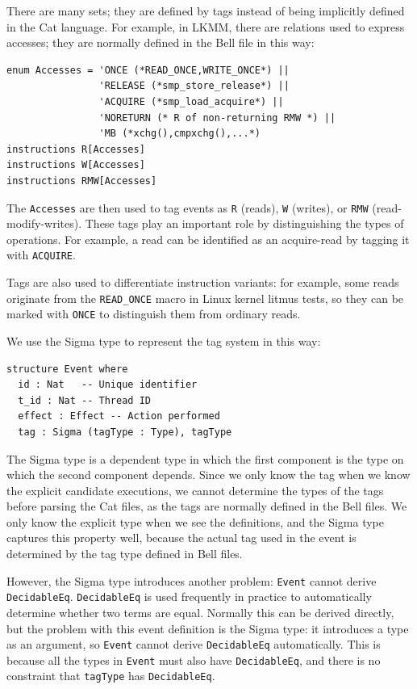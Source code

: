 There are many sets; they are defined by tags instead of being implicitly defined in the Cat language. For example, in LKMM, there are relations used to express accesses; they are normally defined in the Bell file in this way:

\begin{verbatim}
enum Accesses = 'ONCE (*READ_ONCE,WRITE_ONCE*) ||
                'RELEASE (*smp_store_release*) ||
                'ACQUIRE (*smp_load_acquire*) ||
                'NORETURN (* R of non-returning RMW *) ||
                'MB (*xchg(),cmpxchg(),...*)
instructions R[Accesses]
instructions W[Accesses]
instructions RMW[Accesses]
\end{verbatim}

The \texttt{Accesses} are then used to tag events as \texttt{R} (reads), \texttt{W} (writes), or \texttt{RMW} (read-modify-writes). These tags play an important role by distinguishing the types of operations. For example, a read can be identified as an acquire-read by tagging it with \texttt{ACQUIRE}.

Tags are also used to differentiate instruction variants: for example, some reads originate from the \texttt{READ\_ONCE} macro in Linux kernel litmus tests, so they can be marked with \texttt{ONCE} to distinguish them from ordinary reads.

We use the Sigma type to represent the tag system in this way:
\begin{verbatim}
structure Event where
  id : Nat   -- Unique identifier
  t_id : Nat -- Thread ID
  effect : Effect -- Action performed
  tag : Sigma (tagType : Type), tagType
\end{verbatim}

The Sigma type is a dependent type in which the first component is the type on which the second component depends. Since we only know the tag when we know the explicit candidate executions, we cannot determine the types of the tags before parsing the Cat files, as the tags are normally defined in the Bell files. We only know the explicit type when we see the definitions, and the Sigma type captures this property well, because the actual tag used in the event is determined by the tag type defined in Bell files.

However, the Sigma type introduces another problem: \texttt{Event} cannot derive \texttt{DecidableEq}. \texttt{DecidableEq} is used frequently in practice to automatically determine whether two terms are equal. Normally this can be derived directly, but the problem with this event definition is the Sigma type: it introduces a type as an argument, so \texttt{Event} cannot derive \texttt{DecidableEq} automatically. This is because all the types in \texttt{Event} must also have \texttt{DecidableEq}, and there is no constraint that \texttt{tagType} has \texttt{DecidableEq}.

